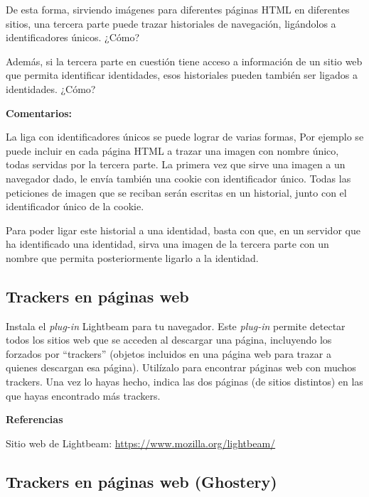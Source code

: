 De esta forma, sirviendo imágenes para diferentes páginas HTML en diferentes sitios, una tercera parte puede trazar historiales de navegación, ligándolos a identificadores únicos. ¿Cómo?

Además, si la tercera parte en cuestión tiene acceso a información de un sitio web que permita identificar identidades, esos historiales pueden también ser ligados a identidades. ¿Cómo?

\textbf{Comentarios:}

La liga con identificadores únicos se puede lograr de varias formas, Por ejemplo se puede incluir en cada página HTML a trazar una imagen con nombre único, todas servidas por la tercera parte. La primera vez que sirve una imagen a un navegador dado, le envía también una cookie con identificador único. Todas las peticiones de imagen que se reciban serán escritas en un historial, junto con el identificador único de la cookie.

Para poder ligar este historial a una identidad, basta con que, en un servidor que ha identificado una identidad, sirva una imagen de la tercera parte con un nombre que permita posteriormente ligarlo a la identidad.

\subsection{Trackers en páginas web}
\label{subsec:trackers-paginas-web}

Instala el \emph{plug-in} Lightbeam para tu navegador. Este \emph{plug-in} permite detectar todos los sitios web que se acceden al descargar una página, incluyendo los forzados por ``trackers'' (objetos incluidos en una página web para trazar a quienes descargan esa página). Utilízalo para encontrar páginas web con muchos trackers. Una vez lo hayas hecho, indica las dos páginas (de sitios distintos) en las que hayas encontrado más trackers.

\textbf{Referencias}

Sitio web de Lightbeam: \url{https://www.mozilla.org/lightbeam/}

\subsection{Trackers en páginas web (Ghostery)}
\label{subsec:trackers-paginas-web-2}


